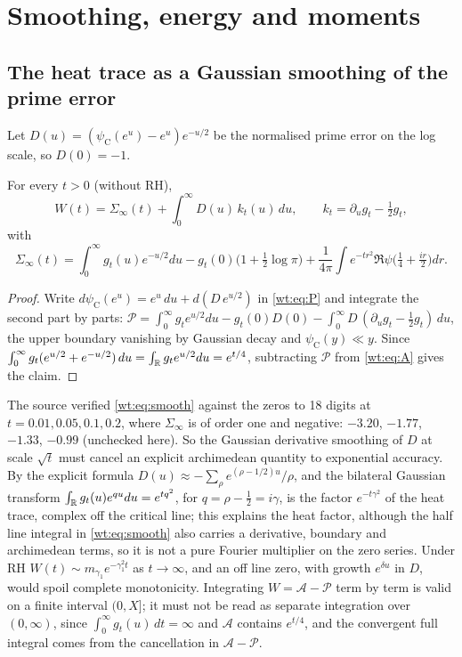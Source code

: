 \section{Smoothing, energy and moments}\label{wt:sec:round2}

\subsection{The heat trace as a Gaussian smoothing of the prime error}

Let $D(u)=(\psi_{\mathrm C}(e^u)-e^u)e^{-u/2}$ be the normalised prime error on the log scale, so $D(0)=-1$.

\begin{proposition}\label{wt:prop:smooth}
For every $t>0$ (without RH),
\begin{equation}\label{wt:eq:smooth}
W(t)=\Sigma_\infty(t)+\int_0^\infty D(u)\,k_t(u)\,du,\qquad k_t=\partial_ug_t-\tfrac12g_t,
\end{equation}
with
\[
\Sigma_\infty(t)=\int_0^\infty g_t(u)e^{-u/2}du-g_t(0)\big(1+\tfrac12\log\pi\big)+\frac1{4\pi}\int e^{-tr^2}\Re\psi\big(\tfrac14+\tfrac{ir}2\big)dr.
\]
\end{proposition}

\begin{proof}
Write $d\psi_{\mathrm C}(e^u)=e^u\,du+d(D\,e^{u/2})$ in \eqref{wt:eq:P} and integrate the second part by parts: $\mathcal P=\int_0^\infty g_te^{u/2}du-g_t(0)D(0)-\int_0^\infty D\,(\partial_ug_t-\frac12g_t)\,du$, the upper boundary vanishing by Gaussian decay and $\psi_{\mathrm C}(y)\ll y$. Since $\int_0^\infty g_t(e^{u/2}+e^{-u/2})\,du=\int_{\mathbb{R}}g_te^{u/2}du=e^{t/4}$, subtracting $\mathcal P$ from \eqref{wt:eq:A} gives the claim.
\end{proof}

The source verified \eqref{wt:eq:smooth} against the zeros to 18 digits at $t=0.01,0.05,0.1,0.2$, where $\Sigma_\infty$ is of order one and negative: $-3.20$, $-1.77$, $-1.33$, $-0.99$ (unchecked here). So the Gaussian derivative smoothing of $D$ at scale $\sqrt t$ must cancel an explicit archimedean quantity to exponential accuracy. By the explicit formula $D(u)\approx-\sum_\rho e^{(\rho-1/2)u}/\rho$, and the bilateral Gaussian transform $\int_{\mathbb{R}}g_t(u)e^{qu}du=e^{tq^2}$, for $q=\rho-\frac12=i\gamma$, is the factor $e^{-t\gamma^2}$ of the heat trace, complex off the critical line; this explains the heat factor, although the half line integral in \eqref{wt:eq:smooth} also carries a derivative, boundary and archimedean terms, so it is not a pure Fourier multiplier on the zero series. Under RH $W(t)\sim m_{\gamma_1}e^{-\gamma_1^2t}$ as $t\to\infty$, and an off line zero, with growth $e^{\delta u}$ in $D$, would spoil complete monotonicity. Integrating $W=\mathcal A-\mathcal P$ term by term is valid on a finite interval $(0,X]$; it must not be read as separate integration over $(0,\infty)$, since $\int_0^\infty g_t(u)\,dt=\infty$ and $\mathcal A$ contains $e^{t/4}$, and the convergent full integral comes from the cancellation in $\mathcal A-\mathcal P$.

